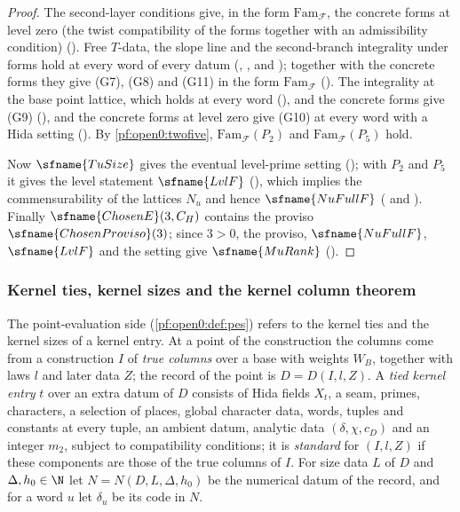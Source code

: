 \begin{proof}
The second-layer conditions give, in the form $\mathrm{Fam}_{\mathcal F}$, the concrete forms at level zero (the twist
compatibility of the forms together with an admissibility condition) ().
Free $T$-data, the slope line and the second-branch integrality under forms hold at every word of every datum
(, , and );
together with the concrete forms they give (G7), (G8) and (G11) in the form $\mathrm{Fam}_{\mathcal F}$
(). The integrality at the base point lattice, which holds at every
word (), and the concrete forms give (G9)
(), and the concrete forms at level zero give (G10) at every word with a Hida
setting (). By \cref{pf:open0:twofive},
$\mathrm{Fam}_{\mathcal F}(P_2)$ and $\mathrm{Fam}_{\mathcal F}(P_5)$ hold.

Now $\sfname{TuSize}$ gives the eventual level-prime setting (); with
$P_2$ and $P_5$ it gives the level statement $\sfname{LvlF}$ (), which implies the
commensurability of the lattices $N_u$ and hence $\sfname{NuFullF}$
( and ). Finally $\sfname{ChosenE}(3,C_H)$
contains the proviso $\sfname{ChosenProviso}(3)$; since $3>0$, the proviso, $\sfname{NuFullF}$, $\sfname{LvlF}$ and the setting give
$\sfname{MuRank}$ ().
\end{proof}

\subsubsection{Kernel ties, kernel sizes and the kernel column theorem}\label{sec:pf:open0:kernel}

The point-evaluation side (\cref{pf:open0:def:pes}) refers to the kernel ties and the kernel sizes of a kernel entry. At a point
of the construction the columns come from a construction $I$ of \emph{true columns} over a base with weights $W_B$, together
with laws $l$ and later data $Z$; the record of the point is $D=D(I,l,Z)$. A \emph{tied kernel entry} $t$ over an extra datum of
$D$ consists of Hida fields $X_t$, a seam, primes, characters, a selection of places, global character data, words, tuples and
constants at every tuple, an ambient datum, analytic data $(\delta,\chi,c_D)$ and an integer $m_2$, subject to compatibility
conditions; it is \emph{standard} for $(I,l,Z)$ if these components are those of the true columns of $I$. For size data $L$ of
$D$ and $\Delta,h_0\in\N$ let $N=N(D,L,\Delta,h_0)$ be the numerical datum of the record, and for a word $u$ let $\delta_u$ be its
code in $N$.

